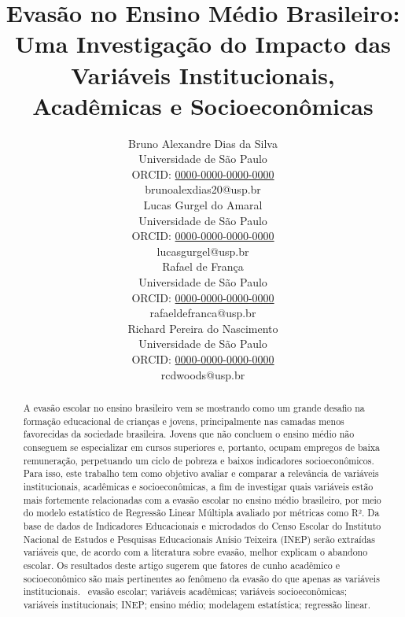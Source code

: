 \documentclass[english, spanish, brazilian]{RBIEarticle} %
\title{Evasão no Ensino Médio Brasileiro: Uma Investigação do Impacto das Variáveis Institucionais, Acadêmicas e Socioeconômicas}
\author{%
	\parbox{3.8cm}{%
		Bruno Alexandre Dias da Silva\\
		Universidade de São Paulo\\
		ORCID: \href{https://orcid.org/0000-0000-0000-0000}{0000-0000-0000-0000}\\
		brunoalexdias20@usp.br
	}
        \hspace{0.3cm}
	\parbox{3.8cm}{%
		Lucas Gurgel do Amaral\\
		Universidade de São Paulo\\
		ORCID: \href{https://orcid.org/0000-0000-0000-0000}{0000-0000-0000-0000}\\
		lucasgurgel@usp.br
	}
        \hspace{0.3cm}
        \parbox{3.8cm}{%
		Rafael de França\\
		Universidade de São Paulo\\
		ORCID: \href{https://orcid.org/0000-0000-0000-0000}{0000-0000-0000-0000}\\
		rafaeldefranca@usp.br
	}
        \hspace{0.3cm}
	\parbox{3.9cm}{\raggedright%
		Richard Pereira do Nascimento\\
		Universidade de São Paulo\\
		ORCID: \href{https://orcid.org/0000-0000-0000-0000}{0000-0000-0000-0000}\\
		rcdwoods@usp.br
	}
}
\begin{document}
\maketitle

\begin{otherlanguage}{brazilian}
\begin{abstract}
A evasão escolar no ensino brasileiro vem se mostrando como um grande desafio na formação educacional de crianças e jovens, principalmente nas camadas menos favorecidas da sociedade brasileira. Jovens que não concluem o ensino médio não conseguem se especializar em cursos superiores e, portanto, ocupam empregos de baixa remuneração, perpetuando um ciclo de pobreza e baixos indicadores socioeconômicos. Para isso, este trabalho tem como objetivo avaliar e comparar a relevância de variáveis institucionais, acadêmicas e socioeconômicas, a fim de investigar quais variáveis estão mais fortemente relacionadas com a evasão escolar no ensino médio brasileiro, por meio do modelo estatístico de Regressão Linear Múltipla avaliado por métricas como R². Da base de dados de Indicadores Educacionais e microdados do Censo Escolar do Instituto Nacional de Estudos e Pesquisas Educacionais Anísio Teixeira (INEP) serão extraídas variáveis que, de acordo com a literatura sobre evasão, melhor explicam o abandono escolar. Os resultados deste artigo sugerem que fatores de cunho acadêmico e socioeconômico são mais pertinentes ao fenômeno da evasão do que apenas as variáveis institucionais.
\keywords\ evasão escolar; variáveis acadêmicas; variáveis socioeconômicas; variáveis institucionais; INEP; ensino médio; modelagem estatística; regressão linear.
\end{abstract}
\end{otherlanguage}
\end{document}
